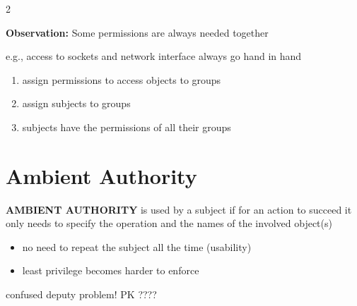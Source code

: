 \documentclass[a4paper,9pt]{extarticle}
\begin{document}
\begin{multicols}{2}
\begin{important}

\textbf{Observation:} Some permissions are always needed together

\end{important}


\begin{example}

e.g., access to sockets and network interface always go hand in hand

\end{example}


\begin{enumerate}[leftmargin=*, itemsep=1pt, topsep=1pt]

\item assign permissions to access objects to groups

\item assign subjects to groups

\item subjects have the permissions of all their groups

\end{enumerate}



\section{Ambient Authority}


\begin{definition}

\textbf{AMBIENT AUTHORITY} is used by a subject if for an action to succeed it only needs to
specify the operation and the names of the involved object(s)

\end{definition}


\begin{itemize}

\item no need to repeat the subject all the time (usability)

\item least privilege becomes harder to enforce

\end{itemize}


\begin{warning}

confused deputy problem! PK ????

\end{warning}



\end{multicols}
\end{document}
